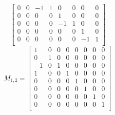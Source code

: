 \begin{example}
\[\begin{bmatrix}
 0 & 0 & -1 & 1 & 0 & 0 & 0 & 0 \\
 0 & 0 & 0 & 0 & 1 & 0 & 0 & 0 \\
 0 & 0 & 0 & 0 & -1 & 1 & 0 & 0 \\
 0 & 0 & 0 & 0 & 0 & 0 & 1 & 0 \\
 0 & 0 & 0 & 0 & 0 & 0 & -1 & 1 \\
\end{bmatrix}
\]
\[
M_{1,2}=\begin{bmatrix}
 1 & 0 & 0 & 0 & 0 & 0 & 0 & 0 \\
 0 & 1 & 0 & 0 & 0 & 0 & 0 & 0 \\
 -1 & 0 & 1 & 0 & 0 & 0 & 0 & 0 \\
 1 & 0 & 0 & 1 & 0 & 0 & 0 & 0 \\
 0 & 0 & 0 & 0 & 1 & 0 & 0 & 0 \\
 0 & 0 & 0 & 0 & 0 & 1 & 0 & 0 \\
 0 & 0 & 0 & 0 & 0 & 0 & 1 & 0 \\
 0 & 0 & 0 & 0 & 0 & 0 & 0 & 1 \\
\end{bmatrix}
\]
\end{example}